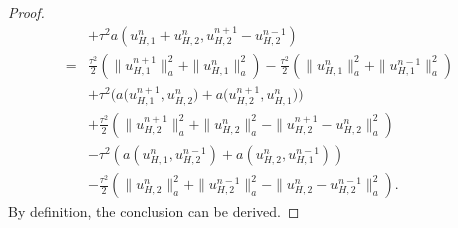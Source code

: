 \documentclass[preprint,12pt]{elsarticle}
\begin{document}
\begin{proof}
\begin{equation}
\begin{aligned}
&+\tau^2a\left(u_{H,1}^{n}+u_{H,2}^{n},u_{H,2}^{n+1}-u_{H,2}^{n-1}\right)\\
=&\frac{\tau^2}{2}\left(\|u_{H,1}^{n+1}\|_a^2+\|u_{H,1}^{n}\|_a^2\right)-\frac{\tau^2}{2}\left(\|u_{H,1}^{n}\|_a^2+\|u_{H,1}^{n-1}\|_a^2\right)\\
&+\tau^2\Big(a\big(u_{H,1}^{n+1},u_{H,2}^{n}\big)+a\big(u_{H,2}^{n+1},u_{H,1}^{n}\big)\Big)\\
&+\frac{\tau^2}{2}\left(\|u_{H,2}^{n+1}\|_a^2+\|u_{H,2}^{n}\|_a^2-\|u_{H,2}^{n+1}-u_{H,2}^{n}\|_a^2\right)\\
&-\tau^2\left(a(u_{H,1}^{n},u_{H,2}^{n-1})+a(u_{H,2}^{n},u_{H,1}^{n-1})\right)\\
&-\frac{\tau^2}{2}\left(\|u_{H,2}^{n}\|_a^2+\|u_{H,2}^{n-1}\|_a^2-\|u_{H,2}^{n}-u_{H,2}^{n-1}\|_a^2\right).
\end{aligned}
\end{equation}
By definition, the conclusion can be derived.
\end{proof}

\end{document}
